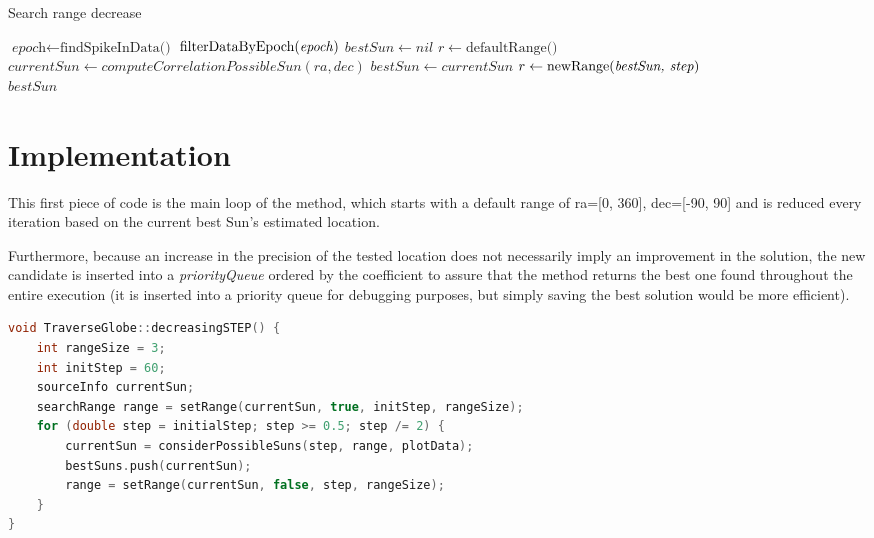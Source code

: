 \begin{algorithm}
	\caption{Search range decrease}\label{searchRangeDecrease}
	\begin{algorithmic}[1]
		\State $\textit{epoch} \gets \text{findSpikeInData()}$
		\State $\text{filterDataByEpoch(\textit{epoch})}$
		\State $bestSun \gets nil$
		\State $r \gets \text{defaultRange()}$
		\State $currentSun \gets computeCorrelationPossibleSun(ra, dec)$
		\State $bestSun \gets currentSun$
		\State $r \gets \text{newRange(\textit{bestSun, step})}$
		\EndIf
		\EndFor
		\EndFor
		\EndFor
		\\
		\Return $bestSun$
		\EndProcedure
	\end{algorithmic}
\end{algorithm}

\section{Implementation}

This first piece of code is the main loop of the method, which starts with a default range of ra=[0, 360], dec=[-90, 90] and is reduced every iteration based on the current best Sun's estimated location.

Furthermore, because an increase in the precision of the tested location does not necessarily imply an improvement in the solution, the new candidate is inserted into a \textit{priorityQueue} ordered by the coefficient to assure that the method returns the best one found throughout the entire execution (it is inserted into a priority queue for debugging purposes, but simply saving the best solution would be more efficient).

\begin{minipage}{\linewidth}
	\begin{lstlisting}[language=c, caption=Decreasing the range and increasing the precision]
void TraverseGlobe::decreasingSTEP() {
	int rangeSize = 3;
	int initStep = 60;
	sourceInfo currentSun;
	searchRange range = setRange(currentSun, true, initStep, rangeSize);
	for (double step = initialStep; step >= 0.5; step /= 2) {
		currentSun = considerPossibleSuns(step, range, plotData);
		bestSuns.push(currentSun);
		range = setRange(currentSun, false, step, rangeSize);
	}
}\end{lstlisting}
\end{minipage}


